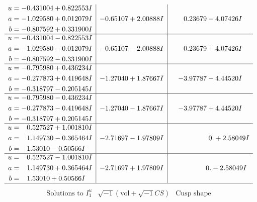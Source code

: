 \documentclass[1p]{elsarticle_modified}
\theoremstyle{definition}
\newcommand{\I}{\sqrt{-1}}
\begin{document}
$$\begin{array}{c|c|c}
\begin{aligned}
u &= -0.431004 + 0.822553 I \\
a &= -1.029580 + 0.012079 I \\
b &= -0.807592 + 0.331900 I\end{aligned}
 & -0.65107 + 2.00888 I & \phantom{-}0.23679 - 4.07426 I \\ \hline\begin{aligned}
u &= -0.431004 - 0.822553 I \\
a &= -1.029580 - 0.012079 I \\
b &= -0.807592 - 0.331900 I\end{aligned}
 & -0.65107 - 2.00888 I & \phantom{-}0.23679 + 4.07426 I \\ \hline\begin{aligned}
u &= -0.795980 + 0.436234 I \\
a &= -0.277873 + 0.419648 I \\
b &= -0.318797 - 0.205145 I\end{aligned}
 & -1.27040 + 1.87667 I & -3.97787 - 4.44520 I \\ \hline\begin{aligned}
u &= -0.795980 - 0.436234 I \\
a &= -0.277873 - 0.419648 I \\
b &= -0.318797 + 0.205145 I\end{aligned}
 & -1.27040 - 1.87667 I & -3.97787 + 4.44520 I \\ \hline\begin{aligned}
u &= \phantom{-}0.527527 + 1.001810 I \\
a &= \phantom{-}1.149730 - 0.365464 I \\
b &= \phantom{-}1.53010 - 0.50566 I\end{aligned}
 & -2.71697 - 1.97809 I & \phantom{-0.000000 -}0. + 2.58049 I \\ \hline\begin{aligned}
u &= \phantom{-}0.527527 - 1.001810 I \\
a &= \phantom{-}1.149730 + 0.365464 I \\
b &= \phantom{-}1.53010 + 0.50566 I\end{aligned}
 & -2.71697 + 1.97809 I & \phantom{-0.000000 } 0. - 2.58049 I\\
 \hline 
 \end{array}$$\newpage$$\begin{array}{c|c|c}  
\text{Solutions to }I^u_{1}& \I (\text{vol} + \sqrt{-1}CS) & \text{Cusp shape}\\
 \hline 
\begin{aligned}

\end{aligned}
\end{array}$$
\end{document}

